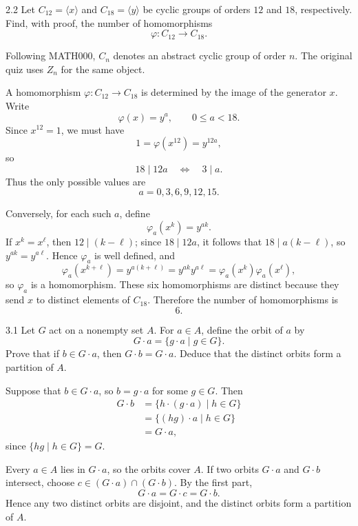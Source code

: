 \documentclass[11pt,oneside]{article}
\begin{document}
\begin{problem}{2.2}
Let $C_{12}=\langle x\rangle$ and $C_{18}=\langle y\rangle$ be cyclic groups of orders $12$ and $18$, respectively. Find, with proof, the number of homomorphisms
\[
    \varphi\colon C_{12}\to C_{18}.
\]
\end{problem}

\begin{notation}
Following MATH000, $C_n$ denotes an abstract cyclic group of order $n$. The original quiz uses $Z_n$ for the same object.
\end{notation}

\begin{solution}
A homomorphism $\varphi\colon C_{12}\to C_{18}$ is determined by the image of the generator $x$. Write
\[
    \varphi(x)=y^a,
    \qquad 0\le a<18.
\]
Since $x^{12}=1$, we must have
\[
    1=\varphi(x^{12})=y^{12a},
\]
so
\[
    18\mid12a
    \quad\Longleftrightarrow\quad
    3\mid a.
\]
Thus the only possible values are
\[
    a=0,3,6,9,12,15.
\]

Conversely, for each such $a$, define
\[
    \varphi_a(x^k)=y^{ak}.
\]
If $x^k=x^\ell$, then $12\mid(k-\ell)$; since $18\mid12a$, it follows that $18\mid a(k-\ell)$, so $y^{ak}=y^{a\ell}$. Hence $\varphi_a$ is well defined, and
\[
    \varphi_a(x^{k+\ell})
    =y^{a(k+\ell)}
    =y^{ak}y^{a\ell}
    =\varphi_a(x^k)\varphi_a(x^\ell),
\]
so $\varphi_a$ is a homomorphism. These six homomorphisms are distinct because they send $x$ to distinct elements of $C_{18}$. Therefore the number of homomorphisms is
\[
    \boxed{6}.
\]
\end{solution}


\begin{problem}{3.1}
Let $G$ act on a nonempty set $A$. For $a\in A$, define the orbit of $a$ by
\[
    G\cdot a=\{g\cdot a\mid g\in G\}.
\]
Prove that if $b\in G\cdot a$, then $G\cdot b=G\cdot a$. Deduce that the distinct orbits form a partition of $A$.
\end{problem}

\begin{solution}
Suppose that $b\in G\cdot a$, so $b=g\cdot a$ for some $g\in G$. Then
\[
\begin{aligned}
    G\cdot b
    &=\{h\cdot(g\cdot a)\mid h\in G\}\\
    &=\{(hg)\cdot a\mid h\in G\}\\
    &=G\cdot a,
\end{aligned}
\]
since $\{hg\mid h\in G\}=G$.

Every $a\in A$ lies in $G\cdot a$, so the orbits cover $A$. If two orbits $G\cdot a$ and $G\cdot b$ intersect, choose $c\in(G\cdot a)\cap(G\cdot b)$. By the first part,
\[
    G\cdot a=G\cdot c=G\cdot b.
\]
Hence any two distinct orbits are disjoint, and the distinct orbits form a partition of $A$.
\end{solution}
\end{document}
